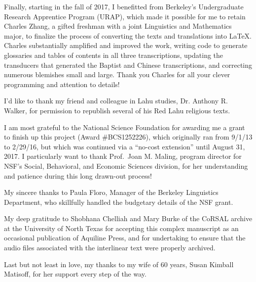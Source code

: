 Finally, starting in the fall of 2017, I benefitted from Berkeley's
Undergraduate Research Apprentice Program (URAP), which made it possible
for me to retain Charles Zhang, a gifted freshman with a joint Linguistics
and Mathematics major, to finalize the process of converting the
texts and translations into LaTeX. Charles substantially amplified and improved the work,
writing code to generate glossaries and tables of contents in all three transcriptions,
updating the transducers that generated the Baptist and Chinese transcriptions, and correcting
numerous blemishes small and large. Thank you Charles for all your clever programming
and attention to details!

I'd like to thank my friend and colleague in Lahu studies, Dr. Anthony
R. Walker, for permission to republish several of his Red Lahu religious
texts.

I am most grateful to the National Science Foundation for awarding me
a grant to finish up this project (Award \#BCS1252226), which
originally ran from 9/1/13 to 2/29/16, but which was continued via a
``no-cost extension'' until August 31, 2017. I particularly want to
thank Prof.\ Joan M. Maling, program director for NSF's Social,
Behavioral, and Economic Sciences division, for her understanding and
patience during this long drawn-out process!

My sincere thanks to Paula Floro, Manager of the Berkeley Linguistics
Department, who skillfully handled the budgetary details of the NSF
grant.

My deep gratitude to Shobhana Chelliah and Mary Burke of the CoRSAL archive at
the University of North Texas
for accepting this complex manuscript as an occasional publication of
Aquiline Press, and for undertaking to ensure that the audio files associated
with the interlinear text were properly archived.

Last but not least in love, my thanks to my wife of 60 years, Susan
Kimball Matisoff, for her support every step of the way.
